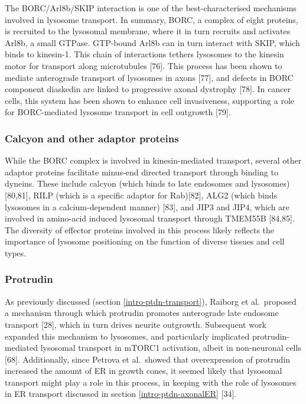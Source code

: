 \documentclass[
  12pt,
  a4paper,
]{book}
\begin{document}
The BORC/Arl8b/SKIP interaction is one of the best-characterised mechanisms involved in lysosome transport. In summary, BORC, a complex of eight proteins, is recruited to the lysosomal membrane, where it in turn recruits and activates Arl8b, a small GTPase. GTP-bound Arl8b can in turn interact with SKIP, which binds to kinesin-1. This chain of interactions tethers lysosomes to the kinesin motor for transport along microtubules {[}76{]}. This process has been shown to mediate anterograde transport of lysosomes in axons {[}77{]}, and defects in BORC component diaskedin are linked to progressive axonal dystrophy {[}78{]}. In cancer cells, this system has been shown to enhance cell invasiveness, supporting a role for BORC-mediated lysosome transport in cell outgrowth {[}79{]}.

\hypertarget{calcyon-and-other-adaptor-proteins}{%
\subsubsection{Calcyon and other adaptor proteins}\label{calcyon-and-other-adaptor-proteins}}

While the BORC complex is involved in kinesin-mediated transport, several other adaptor proteins facilitate minus-end directed transport through binding to dyneins. These include calcyon (which binds to late endosomes and lysosomes){[}80,81{]}, RILP (which is a specific adaptor for Rab){[}82{]}, ALG2 (which binds lysosomes in a calcium-dependent manner) {[}83{]}, and JIP3 and JIP4, which are involved in amino-acid induced lysosomal transport through TMEM55B {[}84,85{]}. The diversity of effector proteins involved in this process likely reflects the importance of lysosome positioning on the function of diverse tissues and cell types.

\hypertarget{protrudin}{%
\subsubsection{Protrudin}\label{protrudin}}

As previously discussed (section \ref{intro-ptdn-transport}), Raiborg et al.~proposed a mechanism through which protrudin promotes anterograde late endosome transport {[}28{]}, which in turn drives neurite outgrowth. Subsequent work expanded this mechanism to lysosomes, and particularly implicated protrudin-mediated lysosomal transport in mTORC1 activation, albeit in non-neuronal cells {[}68{]}. Additionally, since Petrova et al.~showed that overexpression of protrudin increased the amount of ER in growth cones, it seemed likely that lysosomal transport might play a role in this process, in keeping with the role of lysosomes in ER transport discussed in section \ref{intro-ptdn-axonalER} {[}34{]}.
\end{document}
